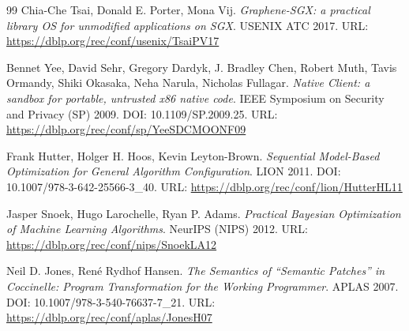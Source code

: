 \documentclass[UTF8,a4paper,12pt,twoside]{ctexart}  %
\begin{document}
\begin{thebibliography}{99}
 Chia-Che Tsai, Donald E. Porter, Mona Vij. \emph{Graphene-SGX:
a practical library OS for unmodified applications on SGX}. USENIX ATC
2017. URL: \url{https://dblp.org/rec/conf/usenix/TsaiPV17}

 Bennet Yee, David Sehr, Gregory Dardyk, J. Bradley Chen, Robert
Muth, Tavis Ormandy, Shiki Okasaka, Neha Narula, Nicholas Fullagar.
\emph{Native Client: a sandbox for portable, untrusted x86 native code}.
IEEE Symposium on Security and Privacy (SP) 2009. DOI:
10.1109/SP.2009.25. URL:
\url{https://dblp.org/rec/conf/sp/YeeSDCMOONF09}

 Frank Hutter, Holger H. Hoos, Kevin Leyton-Brown.
\emph{Sequential Model-Based Optimization for General Algorithm
Configuration}. LION 2011. DOI: 10.1007/978-3-642-25566-3\_40. URL:
\url{https://dblp.org/rec/conf/lion/HutterHL11}

 Jasper Snoek, Hugo Larochelle, Ryan P. Adams. \emph{Practical
Bayesian Optimization of Machine Learning Algorithms}. NeurIPS (NIPS)
2012. URL: \url{https://dblp.org/rec/conf/nips/SnoekLA12}

 Neil D. Jones, René Rydhof Hansen. \emph{The Semantics of
``Semantic Patches'' in Coccinelle: Program Transformation for the
Working Programmer}. APLAS 2007. DOI: 10.1007/978-3-540-76637-7\_21.
URL: \url{https://dblp.org/rec/conf/aplas/JonesH07}
\end{thebibliography}
\end{document}
